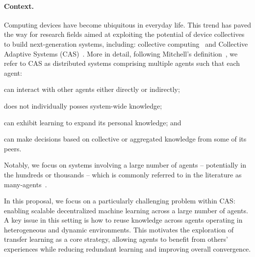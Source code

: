 \documentclass[12pt]{article}
\begin{document}
\paragraph{Context.}
Computing devices have become ubiquitous in everyday life.
%
This trend has paved the way for research fields aimed at exploiting
 the potential of device collectives to build next-generation systems, 
 including: collective computing~\cite{DBLP:journals/computer/Abowd16}
 and Collective Adaptive Systems (CAS)~\cite{DBLP:journals/sttt/WirsingJN23,robyphdthesis}.
%
More in detail, following Mitchell's definition~\cite{DBLP:conf/metacognition/Mitchell05}, 
 we refer to CAS as distributed systems comprising multiple agents 
 such that each agent:
 \begin{enumerate*}[label=(\roman*)]
	\item can interact with other agents either directly or indirectly;
	\item does not individually posses system-wide knowledge;
	\item can exhibit learning to expand its personal knowledge; and
	\item can make decisions based on collective or aggregated knowledge from some of its peers.
 \end{enumerate*}
%
Notably, we focus on systems involving a large number of agents -- potentially in the hundreds
 or thousands -- which is commonly referred to in the literature 
 as many-agents~\cite{DBLP:phd/ethos/Yang21a}.

In this proposal, we focus on a particularly challenging problem within CAS: 
 enabling scalable decentralized machine learning across a large number of agents. 
% 
A key issue in this setting is how to reuse knowledge across agents operating in 
 heterogeneous and dynamic environments. 
% 
This motivates the exploration of transfer learning as a core strategy, 
 allowing agents to benefit from others' experiences while reducing redundant 
 learning and improving overall convergence.
\end{document}

